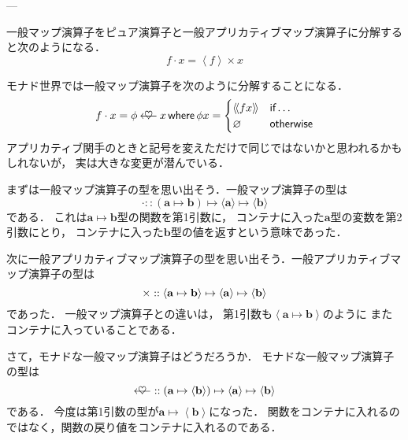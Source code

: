 \documentclass[a4paper,draft]{jsbook}
\newcommand{\mathTypeParameter}[1]{\mathbf{#1}}
\newcommand{\mathPureWith}[1]{\left\langle#1\right\rangle}
\newcommand{\mathUnitWith}[1]{\left\langle\!\left\langle#1\right\rangle\!\right\rangle}
\newcommand{\mathPureNothing}{\varnothing}
\newcommand{\mathApplicativeGeneralMap}{\mathbin{\times}}
\newcommand{\mathBind}{\mathbin{\ooalign{$\longleftarrow$\crcr\hss$\heartsuit$\hss}}}
\newcommand{\mathGeneralMap}{\mathbin{\cdot}}
\newcommand{\mathIn}{\mathrel{::}}
\newcommand{\mathMapsTo}{\mapsto}
\newcommand{\mathKeyword}[1]{\operatorname{\textsf{#1}}}
\newcommand{\mathIf}{\mathKeyword{if}}
\newcommand{\mathOtherwise}{\mathKeyword{otherwise}}
\newcommand{\mathWhere}{\mathKeyword{where}}
\newcommand{\mathMorph}[2]{#1\mathMapsTo#2}
\newcommand{\mathMorphII}[3]{#1\mathMapsTo#2\mathMapsTo#3}
\begin{document}
---

一般マップ演算子をピュア演算子と一般アプリカティブマップ演算子に分解すると次のようになる．
\begin{equation}
f\mathGeneralMap x=\mathPureWith{f}\mathApplicativeGeneralMap x
\end{equation}

モナド世界では一般マップ演算子を次のように分解することになる．
\begin{equation}
f\mathGeneralMap x=\phi\mathBind x
\mathWhere
\phi x=\begin{cases}
\mathUnitWith{fx}&\mathIf\dots\\
\mathPureNothing&\mathOtherwise
\end{cases}
\end{equation}
アプリカティブ関手のときと記号を変えただけで同じではないかと思われるかもしれないが，
実は大きな変更が潜んでいる．

まずは一般マップ演算子の型を思い出そう．一般マップ演算子の型は
\begin{equation}
\mathGeneralMap
\mathIn{}\mathMorphII{(\mathMorph{\mathTypeParameter{a}}{\mathTypeParameter{b}})}{\langle\mathTypeParameter{a}\rangle}{\langle\mathTypeParameter{b}\rangle}
\end{equation}
である．
これは$\mathTypeParameter{a}\mapsto\mathTypeParameter{b}$型の関数を第1引数に，
コンテナに入った$\mathTypeParameter{a}$型の変数を第2引数にとり，
コンテナに入った$\mathTypeParameter{b}$型の値を返すという意味であった．

次に一般アプリカティブマップ演算子の型を思い出そう．一般アプリカティブマップ演算子の型は
\begin{equation}
\mathApplicativeGeneralMap
\mathIn{}\mathMorphII{\langle\mathMorph{\mathTypeParameter{a}}{\mathTypeParameter{b}}\rangle}{\langle\mathTypeParameter{a}\rangle}{\langle\mathTypeParameter{b}\rangle}\\
\end{equation}
であった．
一般マップ演算子との違いは，
第1引数も$\mathPureWith{\mathTypeParameter{a}\mapsto\mathTypeParameter{b}}$のように
またコンテナに入っていることである．

さて，モナドな一般マップ演算子はどうだろうか．
モナドな一般マップ演算子の型は
\begin{equation}
\mathBind
\mathIn{}\mathMorphII{(\mathMorph{\mathTypeParameter{a}}{\langle\mathTypeParameter{b}\rangle})}{\langle\mathTypeParameter{a}\rangle}{\langle{\mathTypeParameter{b}}\rangle}
\end{equation}
である．
今度は第1引数の型が$\mathTypeParameter{a}\mapsto\mathPureWith{\mathTypeParameter{b}}$になった．
関数をコンテナに入れるのではなく，関数の戻り値をコンテナに入れるのである．
\end{document}
